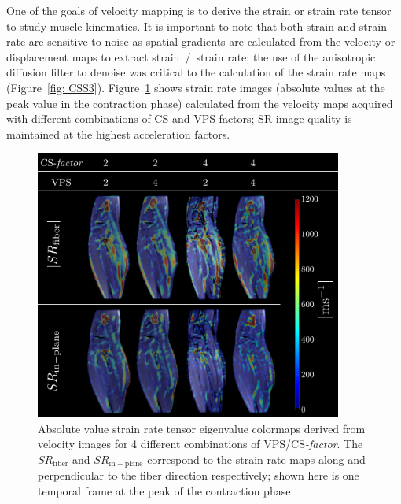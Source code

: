 One of the goals of velocity mapping is to derive the strain or strain rate tensor to study muscle kinematics. 
It is important to note that both strain and strain rate are sensitive to noise as spatial gradients are calculated from the velocity or displacement maps to extract strain~/~strain rate; the use of the anisotropic diffusion filter to denoise was critical to the calculation of the strain rate maps (Figure~\ref{fig: CSS3}). 
Figure~\ref{fig: CS9} shows strain rate images (absolute values at the peak value in the contraction phase) calculated from the velocity maps acquired with different combinations of CS and VPS factors; SR image quality is maintained at the highest acceleration factors. 
\begin{figure}[!htb]
\vspace{+0.2cm}
\centering
\includegraphics[width=0.9\textwidth]{Figures/CS1_14.pdf}
\caption[Absolute value strain rate tensor eigenvalue colormaps derived from velocity images for 4 different combinations of VPS/\mbox{CS\textit{-factor}}]{Absolute value strain rate tensor eigenvalue colormaps derived from velocity images for 4 different combinations of VPS/\mbox{CS\textit{-factor}}. The $SR_\mathrm{fiber}$ and $SR_\mathrm{in-plane}$ correspond to the strain rate maps along and perpendicular to the fiber direction respectively; shown here is one temporal frame at the peak of the contraction phase.}
\label{fig: CS9}
\end{figure}
